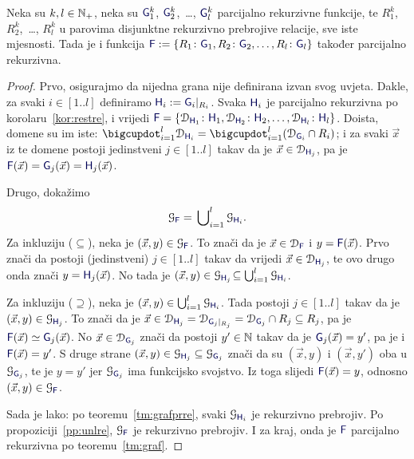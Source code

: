 \begin{teorem}\label{tm:gre}
Neka su $k,l\in{\mathbb N}_+$, neka su $\f G_1^k$, $\f G_2^k$,~\ldots, $\f G_l^k$ parcijalno rekurzivne funkcije, te $R_1^k$, $R_2^k$,~\ldots, $R_l^k$ u parovima disjunktne rekurzivno prebrojive relacije, sve iste mjesnosti. Tada je i funkcija $\f F:=\{R_1\colon\f G_1,R_2\colon\f G_2,\dotsc,R_l\colon\f G_l\}$ također parcijalno rekurzivna.
\end{teorem}
\begin{proof}
Prvo, osigurajmo da nijedna grana nije definirana izvan svog uvjeta. Dakle, za svaki $i\in[1..l]$ definiramo $\f H_i:=\f G_i|_{R_i}$. Svaka $\f H_i$ je parcijalno rekurzivna po korolaru~\ref{kor:restre}, i vrijedi $\f F=\{\dom{\f H_1}\colon\f H_1,\dom{\f H_2}\colon\f H_2,\dotsc,\dom{\f H_l}\colon\f H_l\}$. Doista, domene su im iste: $\bdcup_{i=1}^l\dom{\f H_i}=\bdcup_{i=1}^l(\dom{\f G_i}\cap R_i)$; i za svaki $\vec x$ iz te domene postoji jedinstveni $j\in[1..l]$ takav da je $\vec x\in\dom{\f H_{j}}$, pa je $\f F(\vec x)=\f G_{j}(\vec x)=\f H_{j}(\vec x)$.

Drugo, dokažimo
\begin{equation}
    \graf{\f F}=\,\bigcup\nolimits_{i=1}^l\graf{\f H_i}\text.
\end{equation}
Za inkluziju ($\subseteq$), neka je $(\vec x,y)\in\graf{\f F}$. To znači da je $\vec x\in\dom{\f F}$ i $y=\f F(\vec x)$. Prvo znači da postoji (jedinstveni) $j\in[1..l]$ takav da vrijedi $\vec x\in\dom{\f H_{j}}$, te ovo drugo onda znači $y=\f H_{j}(\vec x)$. No tada je $(\vec x,y)\in\graf{\f H_{j}}\!\subseteq\bigcup_{i=1}^l\graf{\f H_i}$.

Za inkluziju ($\supseteq$), neka je $(\vec x,y)\in\bigcup_{i=1}^l\graf{\f H_i}$. Tada postoji $j\in[1..l]$ takav da je $(\vec x,y)\in\graf{\f H_j}$. To znači da je $\vec x\in\dom{\f H_j}=\dom{\f G_j|_{R_j}}=\dom{\f G_j}\cap R_j\subseteq R_j$, pa je $\f F(\vec x)\simeq\f G_j(\vec x)$. No $\vec x\in\dom{\f G_j}$ znači da postoji $y'\in{\mathbb N}$ takav da je $\f G_j(\vec x)=y'$, pa je i $\f F(\vec x)=y'$. S druge strane $(\vec x,y)\in\graf{\f H_j}\subseteq\graf{\f G_j}$ znači da su $(\vec x,y)$ i $(\vec x,y')$ oba u $\graf{\f G_j}$, te je $y=y'$ jer $\graf{\f G_j}$ ima funkcijsko svojstvo. Iz toga slijedi $\f F(\vec x)=y$, odnosno $(\vec x,y)\in\graf{\f F}$.

Sada je lako: po teoremu~\ref{tm:grafprre}, svaki $\graf{\f H_i}$ je rekurzivno prebrojiv. Po propoziciji~\ref{pp:unlre}, $\graf{\f F}$ je rekurzivno prebrojiv. I za kraj, onda je $\f F$ parcijalno rekurzivna po teoremu~\ref{tm:graf}.
\end{proof}

